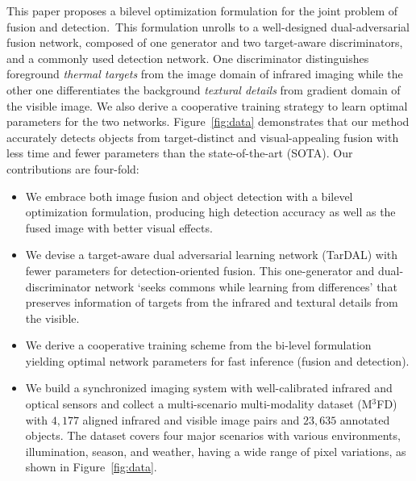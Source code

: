 \documentclass[10pt,twocolumn,letterpaper]{article}
\begin{document}
This paper proposes a bilevel optimization formulation for the joint problem of fusion and detection.~This formulation unrolls to a well-designed dual-adversarial fusion network, composed of one generator and two target-aware discriminators, and a commonly used detection network. One discriminator distinguishes foreground \emph{thermal targets} from the image domain of infrared imaging while the other one differentiates the background \emph{textural details} from gradient domain of the visible image. We also derive a cooperative training strategy to learn optimal parameters for the two networks. Figure~\ref{fig:data} demonstrates that our method accurately detects objects from target-distinct and visual-appealing fusion with less time and fewer parameters than the state-of-the-art (SOTA). Our contributions are four-fold:
\vspace{-0.6cm} 
\begin{itemize}
	\item We embrace both image fusion and object detection with a bilevel optimization formulation, producing high detection accuracy as well as the fused image with better visual effects. 
	\vspace{-0.3cm}
	\item We devise a target-aware dual adversarial learning network (TarDAL) with fewer parameters for detection-oriented fusion. This one-generator and dual-discriminator network `seeks commons while learning from differences' that preserves information of targets from the infrared and textural details from the visible.
	\vspace{-0.3cm}
	\item We derive a cooperative training scheme from the bi-level formulation yielding optimal network parameters for fast inference (fusion and detection).    
	\vspace{-0.3cm}
	\item We build a synchronized imaging system with well-calibrated infrared and optical sensors and collect a multi-scenario multi-modality dataset (M$^3$FD) with $4,177$ aligned infrared and visible image pairs and $23,635$ annotated objects. The dataset covers four major scenarios with various environments, illumination, season, and weather, having a wide range of pixel variations, as shown in Figure~\ref{fig:data}.
\end{itemize}
\end{document}
